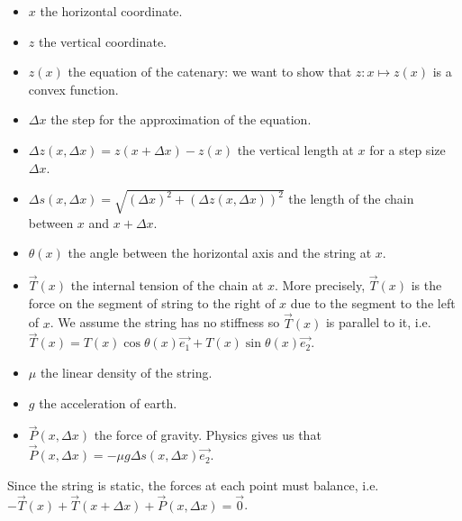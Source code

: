 \begin{itemize}
    \item $x$ the horizontal coordinate.
    \item $z$ the vertical coordinate.
    \item $z(x)$ the equation of the catenary: we want to show that $z:x\mapsto z(x)$ is a convex function.
    \item $\Delta x$ the step for the approximation of the equation.
    \item $\Delta z(x,\Delta x) = z(x+\Delta x) - z(x)$ the vertical length at $x$ for a step size $\Delta x$.
    \item $\Delta s(x, \Delta x) = \sqrt{(\Delta x)^2 + (\Delta z(x,\Delta x))^2}$ the length of the chain between $x$ and $x+\Delta x$.
    \item $\theta(x)$ the angle between the horizontal axis and the string at $x$.
    \item $\overrightarrow{T}(x)$ the internal tension of the chain at $x$. More precisely, $\overrightarrow{T}(x)$ is the force on the segment of string to the right of $x$ due to the segment to the left of $x$.  We assume the string has no stiffness so $\overrightarrow{T}(x)$ is parallel to it, i.e.\ $\overrightarrow{T}(x) = T(x) \cos{\theta(x)} \overrightarrow{e_1} + T(x) \sin{\theta(x)} \overrightarrow{e_2}$.
    \item $\mu$ the linear density of the string.
    \item $g$ the acceleration of earth.
    \item $\overrightarrow{P}(x, \Delta x)$ the force of gravity. Physics gives us that $\overrightarrow{P}(x, \Delta x) = -\mu g \Delta s(x,\Delta x) \overrightarrow{e_2}$.
\end{itemize}

Since the string is static, the forces at each point must balance, i.e. $-\overrightarrow{T}(x)+\overrightarrow{T}(x+\Delta x)+ \overrightarrow{P}(x, \Delta x) = \overrightarrow{0}$.


